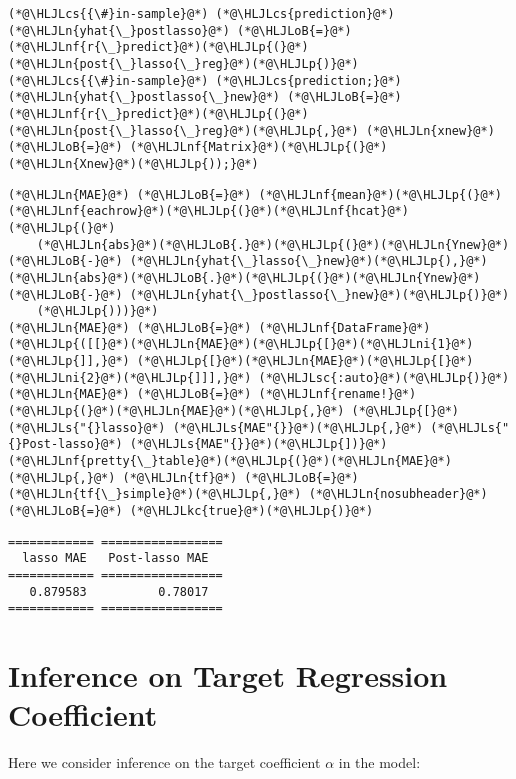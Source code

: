 \documentclass[12pt,a4paper]{article}
\newcommand{\HLJLkc}[1]{\textcolor[RGB]{59,151,46}{\textit{#1}}}
\newcommand{\HLJLn}[1]{#1}
\newcommand{\HLJLnf}[1]{\textcolor[RGB]{66,102,213}{#1}}
\newcommand{\HLJLs}[1]{\textcolor[RGB]{201,61,57}{#1}}
\newcommand{\HLJLsc}[1]{\textcolor[RGB]{201,61,57}{#1}}
\newcommand{\HLJLni}[1]{\textcolor[RGB]{59,151,46}{#1}}
\newcommand{\HLJLoB}[1]{\textcolor[RGB]{102,102,102}{\textbf{#1}}}
\newcommand{\HLJLp}[1]{#1}
\newcommand{\HLJLcs}[1]{\textcolor[RGB]{153,153,119}{\textit{#1}}}
\begin{document}
\begin{lstlisting}
(*@\HLJLcs{{\#}in-sample}@*) (*@\HLJLcs{prediction}@*)
(*@\HLJLn{yhat{\_}postlasso}@*) (*@\HLJLoB{=}@*) (*@\HLJLnf{r{\_}predict}@*)(*@\HLJLp{(}@*)(*@\HLJLn{post{\_}lasso{\_}reg}@*)(*@\HLJLp{)}@*) 
(*@\HLJLcs{{\#}in-sample}@*) (*@\HLJLcs{prediction;}@*)
(*@\HLJLn{yhat{\_}postlasso{\_}new}@*) (*@\HLJLoB{=}@*) (*@\HLJLnf{r{\_}predict}@*)(*@\HLJLp{(}@*)(*@\HLJLn{post{\_}lasso{\_}reg}@*)(*@\HLJLp{,}@*) (*@\HLJLn{xnew}@*) (*@\HLJLoB{=}@*) (*@\HLJLnf{Matrix}@*)(*@\HLJLp{(}@*)(*@\HLJLn{Xnew}@*)(*@\HLJLp{));}@*)
\end{lstlisting}


\begin{lstlisting}
(*@\HLJLn{MAE}@*) (*@\HLJLoB{=}@*) (*@\HLJLnf{mean}@*)(*@\HLJLp{(}@*)(*@\HLJLnf{eachrow}@*)(*@\HLJLp{(}@*)(*@\HLJLnf{hcat}@*)(*@\HLJLp{(}@*)
    (*@\HLJLn{abs}@*)(*@\HLJLoB{.}@*)(*@\HLJLp{(}@*)(*@\HLJLn{Ynew}@*) (*@\HLJLoB{-}@*) (*@\HLJLn{yhat{\_}lasso{\_}new}@*)(*@\HLJLp{),}@*) (*@\HLJLn{abs}@*)(*@\HLJLoB{.}@*)(*@\HLJLp{(}@*)(*@\HLJLn{Ynew}@*) (*@\HLJLoB{-}@*) (*@\HLJLn{yhat{\_}postlasso{\_}new}@*)(*@\HLJLp{)}@*)
    (*@\HLJLp{)))}@*)
(*@\HLJLn{MAE}@*) (*@\HLJLoB{=}@*) (*@\HLJLnf{DataFrame}@*)(*@\HLJLp{([[}@*)(*@\HLJLn{MAE}@*)(*@\HLJLp{[}@*)(*@\HLJLni{1}@*)(*@\HLJLp{]],}@*) (*@\HLJLp{[}@*)(*@\HLJLn{MAE}@*)(*@\HLJLp{[}@*)(*@\HLJLni{2}@*)(*@\HLJLp{]]],}@*) (*@\HLJLsc{:auto}@*)(*@\HLJLp{)}@*)
(*@\HLJLn{MAE}@*) (*@\HLJLoB{=}@*) (*@\HLJLnf{rename!}@*)(*@\HLJLp{(}@*)(*@\HLJLn{MAE}@*)(*@\HLJLp{,}@*) (*@\HLJLp{[}@*)(*@\HLJLs{"{}lasso}@*) (*@\HLJLs{MAE"{}}@*)(*@\HLJLp{,}@*) (*@\HLJLs{"{}Post-lasso}@*) (*@\HLJLs{MAE"{}}@*)(*@\HLJLp{])}@*)
(*@\HLJLnf{pretty{\_}table}@*)(*@\HLJLp{(}@*)(*@\HLJLn{MAE}@*)(*@\HLJLp{,}@*) (*@\HLJLn{tf}@*) (*@\HLJLoB{=}@*) (*@\HLJLn{tf{\_}simple}@*)(*@\HLJLp{,}@*) (*@\HLJLn{nosubheader}@*) (*@\HLJLoB{=}@*) (*@\HLJLkc{true}@*)(*@\HLJLp{)}@*)
\end{lstlisting}

\begin{lstlisting}
============ =================
  lasso MAE   Post-lasso MAE
============ =================
   0.879583          0.78017
============ =================
\end{lstlisting}


\section{Inference on Target Regression Coefficient}
Here we consider inference on the target coefficient $\alpha$ in the model:
\end{document}
